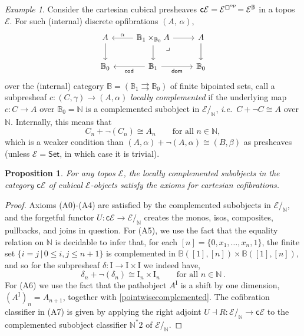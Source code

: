 \documentclass[11pt,reqno]{amsart}
\newcommand{\ie}{\emph{i.e.}}
\newcommand{\C}{\ensuremath{\boxempty}}
\newcommand{\N}{\ensuremath{\mathbb{N}}}
\newcommand{\B}{\ensuremath{\mathbb{B}}}
\newcommand{\EE}{\ensuremath{\mathcal{E}}}
\newcommand{\Set}{\ensuremath{\mathsf{Set}}}
\newcommand{\cEE}{\ensuremath{\mathsf{c}\mathcal{E}}}
\newcommand{\op}[1]{\ensuremath{{#1}^{\mathrm{op}}}}
\newcommand{\dom}{\ensuremath{\mathsf{dom}}}%
\newcommand{\cod}{\ensuremath{\mathsf{cod}}}%
\renewcommand{\to}{\ensuremath{\rightarrow}}
\newcommand{\I}{\ensuremath{\mathrm{I}}}
\newtheorem{proposition}[theorem]{Proposition}
\theoremstyle{remark}
\newtheorem{example}[theorem]{Example}
\theoremstyle{definition}
\newcommand{\pbmark}{\ar[dr, phantom, "\lrcorner" very near start, shift right=.5ex]}	%
\begin{document}
\begin{example}
Consider the cartesian cubical presheaves $\cEE = \EE^{\op{\C}}\!= \EE^{\B}$ in a topos $\EE$.
For such (internal) discrete opfibrations $(A,\, \alpha)$,
\[\begin{tikzcd}
A  \ar[d] & \ar[l,swap,"\alpha"] \ar[d] \B_1 \times_{\B_0} A \ar[r] \pbmark  &  \ar[d] A \\
\B_0 & \ar[l, "\cod" ] \B_1 \ar[r,swap,"\dom"] & \B_0
\end{tikzcd}\]
over the (internal) category $\B = (\B_1\rightrightarrows\B_0)$ of finite bipointed sets, call a subpresheaf $c : (C,\gamma)\to (A,\alpha)$ \emph{locally complemented} if the underlying map $c:C\to A$ over $\B_0 = \N$ is a complemented subobject in $\EE/_{\!\N}$, \ie\ $C+\neg{C} \cong A$ over $\N$.  Internally, this means that
\begin{equation}\label{pointwisecomplemented}
C_n + \neg(C_n) \cong A_n\qquad\text{for all $n\in\N$},
\end{equation}
which is a weaker condition than $(A,\alpha)+\neg (A,\alpha) \cong (B,\beta)$ as presheaves (unless $\EE=\Set$, in which case it is trivial).
\begin{proposition}
 For any topos  $\EE$, the locally complemented subobjects in the category $\cEE$ of cubical $\EE$-objects satisfy the axioms for cartesian cofibrations.
\end{proposition}
\begin{proof}
Axioms (A0)-(A4)  are satisfied by the complemented subobjects in $\EE/_{\!\N}$, and the forgetful functor $U : \cEE \to \EE/_{\!\N}$ creates the monos, isos, composites, pullbacks, and joins in question.  
For (A5), we use the fact that the equality relation on $\N$ is decidable to infer that, for each $[n] = \{0, x_1, \dots, x_n, 1\}$, the finite set $\{i = j \,|\, 0\leq i,j \leq n+1\}$ is complemented in $\B([1],[n])\times \B([1],[n])$,  and so for the subpresheaf $\delta : \I \to \I\times\I$ we indeed have,
\begin{equation}
\delta_n + \neg(\delta_n) \cong \I_n\times \I_n \qquad\text{for all $n\in\N$}\,.
\end{equation}
For (A6) we use the fact that the pathobject $A^{\I}$ is a shift by one dimension, $(A^{\I})_{n} = A_{n+1}$, together with \eqref{pointwisecomplemented}.
The cofibration classifier in (A7) is given by applying the right adjoint $U \dashv R : \EE/_\N \to \cEE$ to the complemented subobject classifier $\N^*2$ of $\EE/_{\!\N}$.
\end{proof}
%
\end{example}
\end{document}
